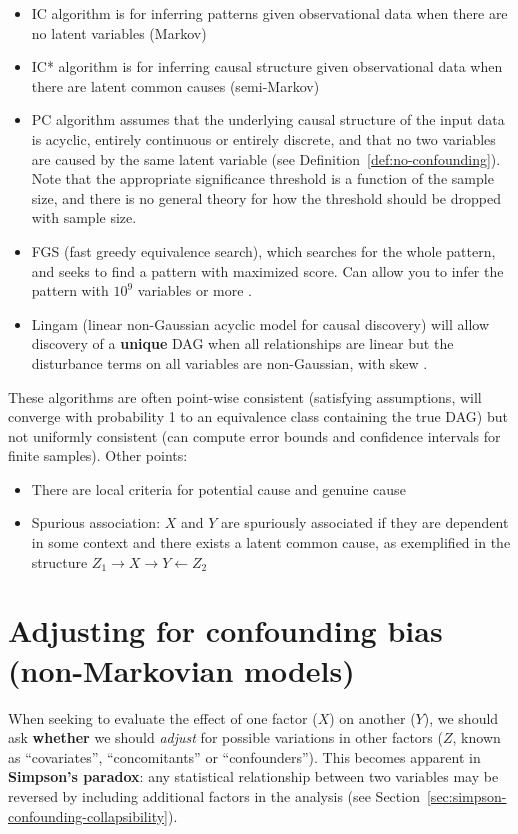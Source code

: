 \documentclass[11pt]{article}
\numberwithin{equation}{section}
\begin{document}
\begin{itemize}
\item IC algorithm is for inferring patterns given observational data when there are no latent variables (Markov)
\item IC* algorithm is for inferring causal structure given observational data when there are latent common causes (semi-Markov) 
\item PC algorithm \citep{spirtes10} assumes that the underlying causal structure of the input data is acyclic, entirely continuous or entirely discrete, and that no two variables are caused by the same latent variable (see Definition~\ref{def:no-confounding}). Note that the appropriate significance threshold is a function of the sample size, and there is no general theory for how the threshold should be dropped with sample size.
\item FGS (fast greedy equivalence search), which searches for the whole pattern, and seeks to find a pattern with maximized score. Can allow you to infer the pattern with $10^9$ variables or more \citep{Ramsey17}.
\item Lingam (linear non-Gaussian acyclic model for causal discovery) will allow discovery of a \textbf{unique} DAG when all relationships are linear but the disturbance terms on all variables are non-Gaussian, with skew \citep{Shimizu06}.
\end{itemize}

These algorithms are often point-wise consistent (satisfying assumptions, will converge with probability 1 to an equivalence class containing the true DAG) but not uniformly consistent (can compute error bounds and confidence intervals for finite samples). Other points:
\begin{itemize}
\item There are local criteria for potential cause and genuine cause
\item Spurious association: $X$ and $Y$ are spuriously associated if they are dependent in some context and there exists a latent common cause, as exemplified in the structure $Z_1 \rightarrow X \rightarrow Y \leftarrow Z_2$
\end{itemize}

\section{Adjusting for confounding bias (non-Markovian models)}

When seeking to evaluate the effect of one factor ($X$) on another ($Y$), we should ask \textbf{whether} we should \textit{adjust} for possible variations in other factors ($Z$, known as ``covariates'', ``concomitants'' or ``confounders''). This becomes apparent in \textbf{Simpson's paradox}: any statistical relationship between two variables may be reversed by including additional factors in the analysis (see Section~\ref{sec:simpson-confounding-collapsibility}).
\end{document}
